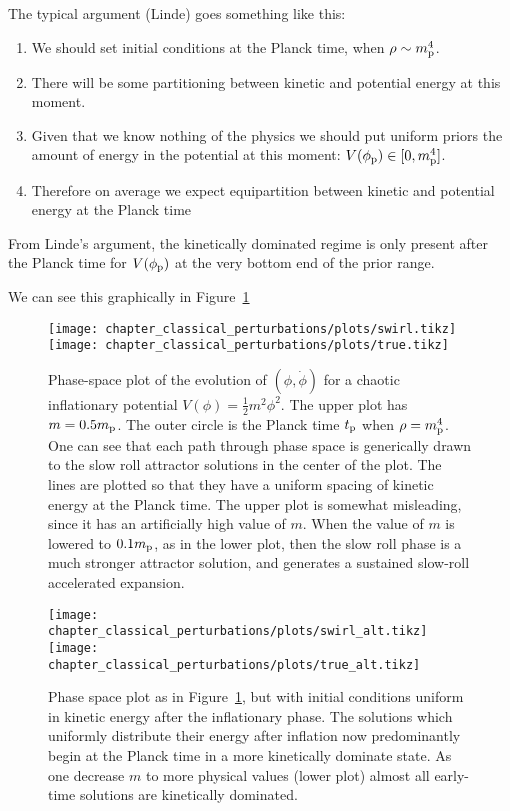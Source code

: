 The typical argument (Linde) goes something like this:

\begin{enumerate}
  \item We should set initial conditions at the Planck time, when
    $\rho\sim m_{\mathrm{p}}^4$.
  \item There will be some partitioning between kinetic and potential
    energy at this moment.
  \item Given that we know nothing of the physics we should put
    uniform priors the amount of energy in the potential at this
    moment: $V(\phi_{\mathrm{p}})\in[0,m_{\mathrm{p}}^4]$.
  \item Therefore on average we expect equipartition between kinetic
    and potential energy at the Planck time
\end{enumerate}

From Linde's argument, the kinetically dominated regime is only present
after the Planck time for $V(\phi_{\mathrm{p}})$ at the very bottom end of the
prior range.

We can see this graphically in Figure~\ref{fig:cls:linde}

\ifdefined\lightweight{}
\else
\begin{figure}[tp]
  \centering
  \texttt{[image: chapter\_classical\_perturbations/plots/swirl.tikz]}
  \texttt{[image: chapter\_classical\_perturbations/plots/true.tikz]}
  \caption{Phase-space plot of the evolution of $(\phi,\dot{\phi})$ for a chaotic inflationary potential $V(\phi) = \frac{1}{2}m^2 \phi^2$. The upper plot has $m=0.5m_{\mathrm{p}}$. The outer circle is the Planck time $t_{\mathrm{p}}$ when $\rho=m_{\mathrm{p}}^4$. One can see that each path through phase space is generically drawn to the slow roll attractor solutions in the center of the plot. The lines are plotted so that they have a uniform spacing of kinetic energy at the Planck time.
  The upper plot is somewhat misleading, since it has an artificially high value of $m$. When the value of $m$ is lowered to $0.1m_{\mathrm{p}}$, as in the lower plot, then the slow roll phase is a much stronger attractor solution, and generates a sustained slow-roll accelerated expansion.\label{fig:cls:linde}}
\end{figure}

\begin{figure}[tp]
  \centering
  \texttt{[image: chapter\_classical\_perturbations/plots/swirl\_alt.tikz]}
  \texttt{[image: chapter\_classical\_perturbations/plots/true\_alt.tikz]}
  \caption{Phase space plot as in Figure~\protect\ref{fig:cls:linde}, but with initial conditions uniform in kinetic energy after the inflationary phase. The solutions which uniformly distribute their energy after inflation now predominantly begin at the Planck time in a more kinetically dominate state. As one decrease $m$ to more physical values (lower plot) almost all early-time solutions are kinetically dominated.\label{fig:cls:b4infl}}
\end{figure}
\fi





